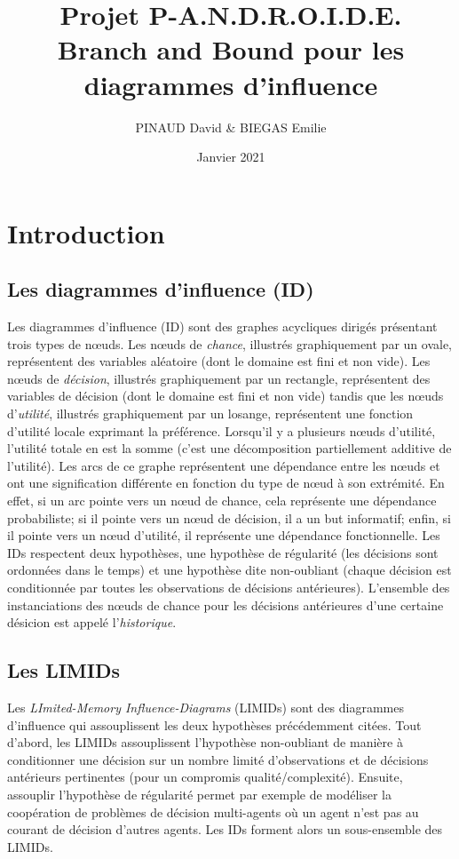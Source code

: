 \documentclass[12pt]{article}
\title{Projet P-A.N.D.R.O.I.D.E.\\
\bigbreak\textbf{Branch and Bound pour les diagrammes d'influence}}
\author{PINAUD David \& BIEGAS Emilie}
\date{Janvier 2021}
\affil{Université Sorbonne Sciences}
\begin{document}
\maketitle

\renewcommand{\contentsname}{Table des Matières}
\pagebreak
\tableofcontents
\pagebreak

\section{Introduction}

\subsection{Les diagrammes d'influence (ID)}
Les diagrammes d'influence (ID) sont des graphes acycliques dirigés présentant trois types de nœuds. Les nœuds de \textit{chance}, illustrés graphiquement par un ovale, représentent des variables aléatoire (dont le domaine est fini et non vide). 
Les nœuds de \textit{décision}, illustrés graphiquement par un rectangle, représentent des variables de décision (dont le domaine est fini et non vide) tandis que les nœuds d'\textit{utilité}, illustrés graphiquement par un losange, représentent une fonction d'utilité locale exprimant la préférence.
Lorsqu'il y a plusieurs nœuds d'utilité, l'utilité totale en est la somme (c'est une décomposition partiellement additive de l'utilité).
\bigbreak
Les arcs de ce graphe représentent une dépendance entre les nœuds et ont une signification différente en fonction du type de nœud à son extrémité.
En effet, si un arc pointe vers un nœud de chance, cela représente une dépendance probabiliste; si il pointe vers un nœud de décision, il a un but informatif; enfin, si il pointe vers un nœud d'utilité, il représente une dépendance fonctionnelle.
\bigbreak
Les IDs respectent deux hypothèses, une hypothèse de régularité (les décisions sont ordonnées dans le temps) et une hypothèse dite non-oubliant (chaque décision est conditionnée par toutes les observations de décisions antérieures).
L'ensemble des instanciations des nœuds de chance pour les décisions antérieures d'une certaine désicion est appelé l'\textit{historique}.


\subsection{Les LIMIDs}
 Les \textit{LImited-Memory Influence-Diagrams} (LIMIDs) sont des diagrammes d'influence qui assouplissent les deux hypothèses précédemment citées. 
 \bigbreak
 Tout d'abord, les LIMIDs assouplissent l'hypothèse non-oubliant de manière à conditionner une décision sur un nombre limité d'observations et de décisions antérieurs pertinentes (pour un compromis qualité/complexité).
\bigbreak
Ensuite, assouplir l'hypothèse de régularité permet par exemple de modéliser la coopération de problèmes de décision multi-agents où un agent n'est pas au courant de décision d'autres agents. 
Les IDs forment alors un sous-ensemble des LIMIDs.
\end{document}
